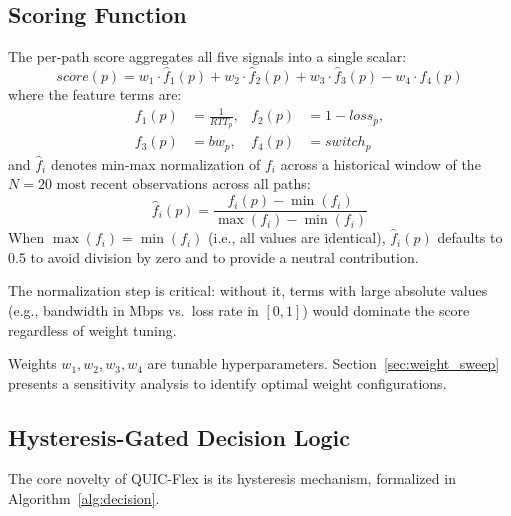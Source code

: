 \documentclass[conference,10pt]{IEEEtran}
\begin{document}
\subsection{Scoring Function}
\label{sec:scoring}

The per-path score aggregates all five signals into a single scalar:
\begin{equation}
score(p) = w_1 \cdot \hat{f}_1(p) + w_2 \cdot \hat{f}_2(p) + w_3 \cdot \hat{f}_3(p) - w_4 \cdot \hat{f}_4(p)
\label{eq:score}
\end{equation}
where the feature terms are:
\begin{align}
f_1(p) &= \frac{1}{RTT_p}, &
f_2(p) &= 1 - loss_p, \nonumber \\
f_3(p) &= bw_p, &
f_4(p) &= switch_p
\label{eq:features}
\end{align}
and $\hat{f}_i$ denotes min-max normalization of $f_i$ across a historical window of the $N = 20$ most recent observations across all paths:
\begin{equation}
\hat{f}_i(p) = \frac{f_i(p) - \min(f_i)}{\max(f_i) - \min(f_i)}
\label{eq:normalize}
\end{equation}
When $\max(f_i) = \min(f_i)$ (i.e., all values are identical), $\hat{f}_i(p)$ defaults to 0.5 to avoid division by zero and to provide a neutral contribution.

The normalization step is critical: without it, terms with large absolute values (e.g., bandwidth in Mbps vs.\ loss rate in $[0, 1]$) would dominate the score regardless of weight tuning.

Weights $w_1, w_2, w_3, w_4$ are tunable hyperparameters.
Section~\ref{sec:weight_sweep} presents a sensitivity analysis to identify optimal weight configurations.

\subsection{Hysteresis-Gated Decision Logic}
\label{sec:hysteresis}

The core novelty of QUIC-Flex is its hysteresis mechanism, formalized in Algorithm~\ref{alg:decision}.
\end{document}
